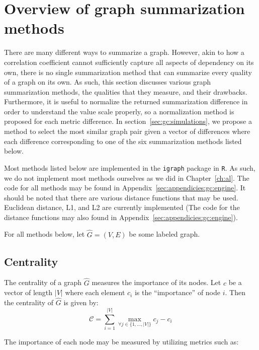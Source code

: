 \section{Overview of graph summarization methods}
\label{sec:gc:methods}

There are many different ways to summarize a graph. However, akin to how a
correlation coefficient cannot sufficiently capture all aspects of dependency 
on its own, there is no single summarization method that can summarize 
every quality of a graph on its own. As such, this section discusses various 
graph summarization methods, the qualities that they measure, and their 
drawbacks. Furthermore, it is useful to normalize the returned 
summarization difference in order to understand the value scale properly, so a 
normalization method is proposed for each metric difference. 
In section~\ref{sec:gc:simulations}, we propose a method to select the most 
similar graph pair given a vector of differences where each difference 
corresponding to one of the six summarization methods listed below.

Most methods listed below are implemented in the \texttt{igraph} package in 
\texttt{R}. As such, we do not implement most methods ourselves as we did in 
Chapter~\ref{ch:al}. The code for 
all methods may be found in Appendix~\ref{sec:appendicies:gc:engine}. It should 
be noted that there are various distance functions that may be used. 
Euclidean distance, L1, and L2 are currently implemented (The code for the 
distance functions may also found in Appendix~\ref{sec:appendicies:gc:engine}). 

For all methods below, let $\hat{G}=(V,E)$ be some labeled graph.

\subsection{Centrality}
\label{sec:gc:methods:centrality}

The centrality of a graph $\hat{G}$ measures the importance of its 
nodes. Let $c$ be a vector of length $|V|$ where each element 
$c_i$ is the ``importance'' of node $i$. Then the centrality of $\hat{G}$ is 
given by:
$$\mathcal{C} = \sum\limits^{|V|}_{i=1} \max_{\forall j \in \{1,...,|V|\}} 
c_j - c_i$$

\noindent The importance of each node may be measured by utilizing metrics such 
as:

